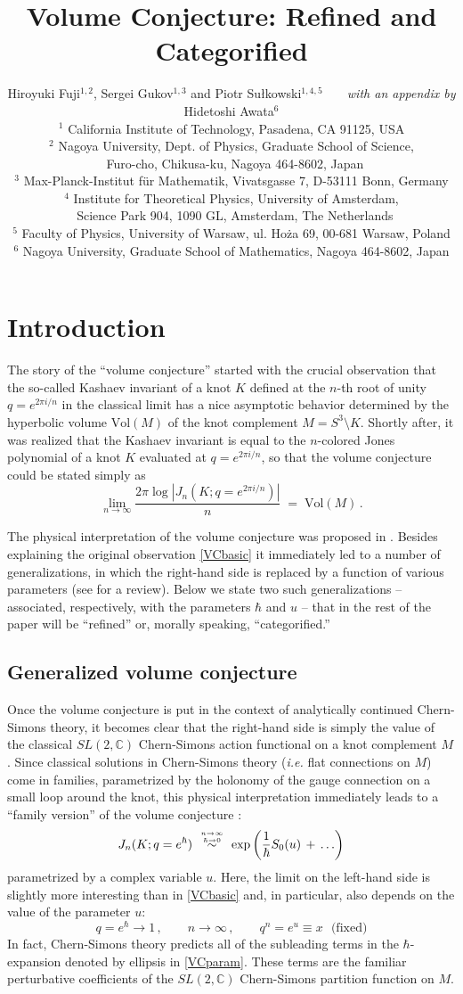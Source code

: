 \documentclass[hyper,letterpaper]{JHEP3}
\title{Volume Conjecture: Refined and Categorified}
\author{Hiroyuki Fuji$^{1,2}$, Sergei Gukov$^{1,3}$ and Piotr Su{\l}kowski$^{1,4,5}$
\hspace*{8cm} $\quad\;$ {\it with an appendix by}  Hidetoshi Awata$^{6}$
\\
$^1$ California Institute of Technology, Pasadena, CA 91125, USA \\
$^2$ Nagoya University, Dept. of Physics, Graduate School of Science, \\
$\ $ Furo-cho, Chikusa-ku, Nagoya 464-8602, Japan \\
$^3$ Max-Planck-Institut f\"ur Mathematik, Vivatsgasse 7, D-53111 Bonn, Germany \\
$^4$ Institute for Theoretical Physics, University of Amsterdam, \\
$\ $ Science Park 904, 1090 GL, Amsterdam, The Netherlands \\
$^5$ Faculty of Physics, University of Warsaw, ul. Ho{\.z}a 69, 00-681
Warsaw, Poland \\
$^6$ Nagoya University, Graduate School of Mathematics, Nagoya 464-8602, Japan}
\newcommand{\be}{\begin{equation}}
\newcommand{\ee}{\end{equation}}
\newcommand{\C}{{\mathbb C}}
\begin{document}

\section{Introduction}    \label{sec-intro}

The story of the ``volume conjecture'' started with the crucial observation \cite{Kashaev} that the so-called Kashaev invariant of a knot $K$
defined at the $n$-th root of unity $q = e^{2 \pi i / n}$ in the classical limit has a nice asymptotic behavior
determined by the hyperbolic volume $\text{Vol} (M)$ of the knot complement $M = S^3 \setminus K$.
Shortly after, it was realized \cite{MurMur} that the Kashaev invariant is equal to the $n$-colored Jones polynomial of a knot $K$
evaluated at $q = e^{2 \pi i / n}$, so that the volume conjecture could be stated simply as
\be
\lim_{n \to \infty} \frac{2 \pi \log |J_n (K; q = e^{2 \pi i / n})|}{n} \; = \; \text{Vol} (M) \,.
\label{VCbasic}
\ee

The physical interpretation of the volume conjecture was proposed in \cite{Apol}.
Besides explaining the original observation \eqref{VCbasic} it immediately led to a number
of generalizations, in which the right-hand side is replaced by a function of various parameters (see \cite{DGreview} for a review).
Below we state two such generalizations -- associated, respectively, with the parameters $\hbar$ and $u$ -- that
in the rest of the paper will be ``refined'' or, morally speaking, ``categorified.''

\subsection{Generalized volume conjecture}

Once the volume conjecture is put in the context of analytically continued Chern-Simons theory,
it becomes clear that the right-hand side is simply the value of the classical $SL(2,\C)$ Chern-Simons action functional on a knot complement $M$.
Since classical solutions in Chern-Simons theory ({\it i.e.} flat connections on $M$) come in families,
parametrized by the holonomy of the gauge connection on a small loop around the knot,
this physical interpretation immediately leads to a ``family version'' of the volume conjecture \cite{Apol}:
\be
J_n (K; q = e^{\hbar}) \;\overset{{n \to \infty \atop \hbar \to 0}}{\sim}\;
\exp \left( \frac{1}{\hbar} S_0 (u) \,+\, \ldots %
\right)
\label{VCparam}
\ee
parametrized by a complex variable $u$. Here, the limit on the left-hand side is slightly more interesting
than in \eqref{VCbasic} and, in particular, also depends on the value of the parameter $u$:
\be
q = e^{\hbar} \to 1 \,, \qquad
n \to \infty \,, \qquad
q^n = e^u \equiv x  ~~~\text{(fixed)}
\label{VClimit}
\ee
In fact, Chern-Simons theory predicts all of the subleading terms in the $\hbar$-expansion denoted by ellipsis in \eqref{VCparam}.
These terms are the familiar perturbative coefficients of the $SL(2,\C)$ Chern-Simons partition function on $M$.
\end{document}

